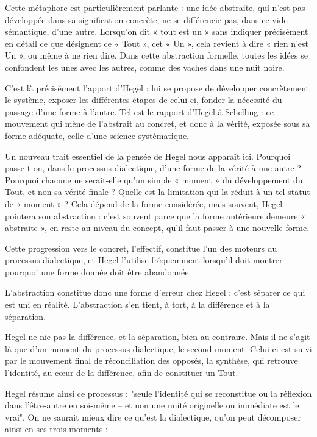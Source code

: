 Cette métaphore est particulièrement parlante : une idée abstraite, qui n’est pas développée dans sa signification concrète, ne se différencie pas, dans ce vide sémantique, d’une autre. Lorsqu’on dit « tout est un » sans indiquer précisément en détail ce que désignent ce « Tout », cet « Un », cela revient à dire « rien n’est Un », ou même à ne rien dire. Dans cette abstraction formelle, toutes les idées se confondent les unes avec les autres, comme des vaches dans une nuit noire.

C’est là précisément l’apport d’Hegel : lui se propose de développer concrètement le système, exposer les différentes étapes de celui-ci, fonder la nécessité du passage d’une forme à l’autre. Tel est le rapport d’Hegel à Schelling : ce mouvement qui mène de l’abstrait au concret, et donc à la vérité, exposée sous sa forme adéquate, celle d’une science systématique.

Un nouveau trait essentiel de la pensée de Hegel nous apparaît ici. Pourquoi passe-t-on, dans le processus dialectique, d’une forme de la vérité à une autre ? Pourquoi chacune ne serait-elle qu’un simple « moment » du développement du Tout, et non sa vérité finale ? Quelle est la limitation qui la réduit à un tel statut de « moment » ? Cela dépend de la forme considérée, mais souvent, Hegel pointera son abstraction : c’est souvent parce que la forme antérieure demeure « abstraite », en reste au niveau du concept, qu’il faut passer à une nouvelle forme.

Cette progression vers le concret, l’effectif, constitue l’un des moteurs du processus dialectique, et Hegel l’utilise fréquemment lorsqu’il doit montrer pourquoi une forme donnée doit être abandonnée.

L’abstraction constitue donc une forme d’erreur chez Hegel : c’est séparer ce qui est uni en réalité. L’abstraction s’en tient, à tort, à la différence et à la séparation.

Hegel ne nie pas la différence, et la séparation, bien au contraire. Mais il ne s’agit là que d’un moment du processus dialectique, le second moment. Celui-ci est suivi par le mouvement final de réconciliation des opposés, la synthèse, qui retrouve l’identité, au cœur de la différence, afin de constituer un Tout.

Hegel résume ainsi ce processus : "seule l’identité qui se reconstitue ou la réflexion dans l’être-autre en soi-même – et non une unité originelle ou immédiate est le vrai". On ne saurait mieux dire ce qu’est la dialectique, qu’on peut décomposer ainsi en ses trois moments :

